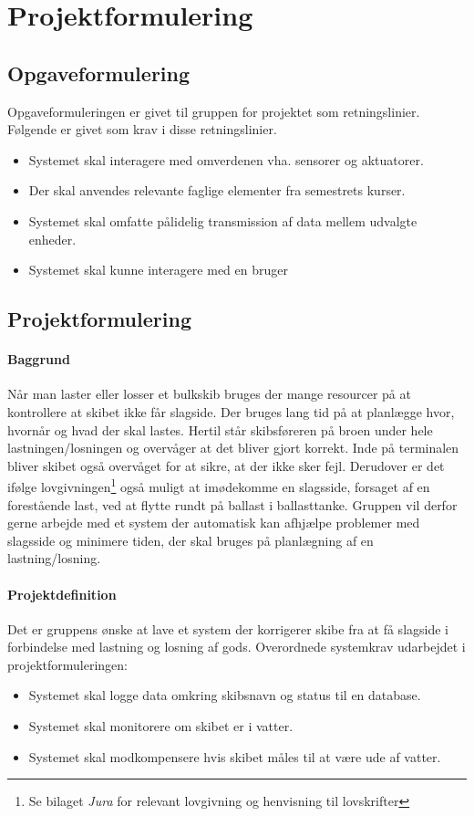 \chapter{Projektformulering}
\section{Opgaveformulering}
\label{ch:Opgaveformulering}
Opgaveformuleringen er givet til gruppen for projektet som retningslinier. Følgende er givet som krav i disse retningslinier.
\begin{itemize}
\item Systemet skal interagere med omverdenen vha. sensorer og aktuatorer.
\item Der skal anvendes relevante faglige elementer fra semestrets kurser.
\item Systemet skal omfatte pålidelig transmission af data mellem udvalgte enheder.
\item Systemet skal kunne interagere med en bruger
\end{itemize}
\section{Projektformulering}
\label{ch:Projektformulering}
\subsubsection{Baggrund}
Når man laster eller losser et bulkskib bruges der mange resourcer på at kontrollere at skibet ikke får slagside. Der bruges lang tid på at planlægge hvor, hvornår og hvad der skal lastes. Hertil står skibsføreren på broen under hele lastningen/losningen og overvåger at det bliver gjort korrekt. Inde på terminalen bliver skibet også overvåget for at sikre, at der ikke sker fejl. Derudover er det ifølge lovgivningen\footnote{Se bilaget \textit{Jura} for relevant lovgivning og henvisning til lovskrifter} også muligt at imødekomme en slagsside, forsaget af en forestående last, ved at flytte rundt på ballast i ballasttanke. Gruppen vil derfor gerne arbejde med et system der automatisk kan afhjælpe problemer med slagsside og minimere tiden, der skal bruges på planlægning af en lastning/losning.

\subsubsection{Projektdefinition}
Det er gruppens ønske at lave et system der korrigerer skibe fra at få slagside i forbindelse med lastning og losning af gods. Overordnede systemkrav udarbejdet i projektformuleringen:
\begin{itemize}
\item Systemet skal logge data omkring skibsnavn og status til en database.
\item Systemet skal monitorere om skibet er i vatter.
\item Systemet skal modkompensere hvis skibet måles til at være ude af vatter.
\end{itemize}
